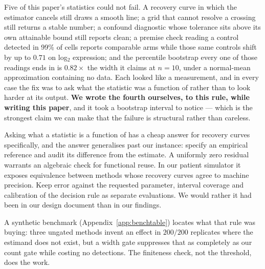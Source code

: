 \iffull
Five of this paper's statistics could not fail. A recovery curve in which the
estimator cancels still draws a smooth line; a grid that cannot resolve a
crossing still returns a stable number; a confound diagnostic whose tolerance
sits above its own attainable bound still reports clean; a premise check
reading a control detected in 99\% of cells reports comparable arms while those
same controls shift by up to $0.71$ on log$_2$ expression; and the percentile
bootstrap every one of those readings ends in is $0.82\times$ the width it claims
at $n = 10$, under a normal-mean approximation containing no data. Each looked like a
measurement, and in every case the fix was to ask what the statistic was a
function of rather than to look harder at its output. \textbf{We wrote the
fourth ourselves, to this rule, while writing this paper}, and it took a
bootstrap interval to notice --- which is the strongest claim we can make that
the failure is structural rather than careless.
\fi

Asking what a statistic is a function of has a cheap answer for recovery curves
specifically, and the answer generalises past our instance: specify an empirical reference and audit its difference from the estimate.
A uniformly zero residual warrants an algebraic check for functional reuse.
In our patient simulator it exposes equivalence between methods whose recovery
curves agree to machine precision. Keep error against the requested parameter,
interval coverage and calibration of the decision rule as separate evaluations.
We would rather it had been in our design document than in our findings.

A synthetic benchmark (Appendix~\ref{app:benchtable}) locates what that rule was
buying: three ungated methods invent an effect in $200/200$ replicates where the
estimand does not exist, but a width gate suppresses that as completely as our
count gate while costing no detections. The finiteness check, not the threshold,
does the work.
